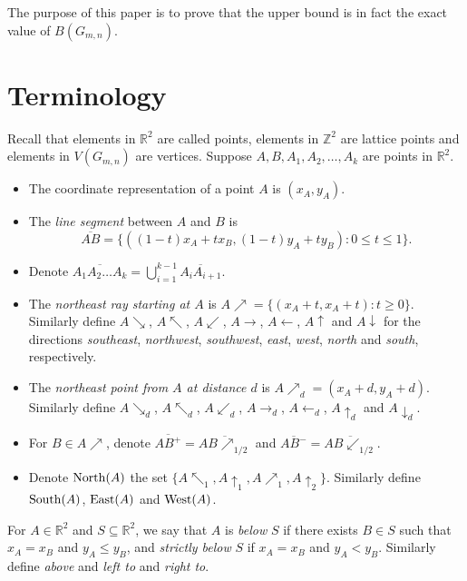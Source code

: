 \documentclass[preprint,12pt]{elsarticle}
\def\NEarrow#1{#1{\nearrow}}
\def\SEarrow#1{#1{\searrow}}
\def\NWarrow#1{#1{\nwarrow}}
\def\SWarrow#1{#1{\swarrow}}
\def\Westarrow#1{#1{\leftarrow}}
\def\Eastarrow#1{#1{\rightarrow}}
\def\Northarrow#1{#1{\uparrow}}
\def\Southarrow#1{#1{\downarrow}}
\def\NEArrow#1#2{#1{\nearrow}_{#2}}
\def\SEArrow#1#2{#1{\searrow}_{#2}}
\def\NWArrow#1#2{#1{\nwarrow}_{#2}}
\def\SWArrow#1#2{#1{\swarrow}_{#2}}
\def\WestArrow#1#2{#1{\leftarrow}_{#2}}
\def\EastArrow#1#2{#1{\rightarrow}_{#2}}
\def\NorthArrow#1#2{#1{\uparrow}_{#2}}
\def\SouthArrow#1#2{#1{\downarrow}_{#2}}
\def\North{{\rm North}}
\def\South{{\rm South}}
\def\East{{\rm East}}
\def\West{{\rm West}}
\begin{document}
{The purpose of this paper is to
prove that the upper bound is in fact the exact value of $B(G_{m,n})$.

\section{Terminology}\label{sec2}

Recall that elements in $\mathbb{R}^2$ are called points,
elements in $\mathbb{Z}^2$ are lattice points
and elements in $V(G_{m,n})$ are vertices.
Suppose $A,B,A_1,A_2,\ldots,A_k$ are points in $\mathbb{R}^2$.
\begin{itemize}
\item The coordinate representation of a point $A$ is $(x_A,y_A)$.

\item The {\em line segment} between $A$ and $B$ is
$$\overline{AB} = \{((1-t)x_A+tx_B,(1-t)y_A+ty_B): 0\le t\le 1\}.$$

\item Denote $\overline{A_1 A_2 \ldots A_k}=\bigcup_{i=1}^{k-1} \overline{A_i A_{i+1}}$.

\item The {\em northeast ray starting at $A$} is $\NEarrow{A}=\{(x_A+t,x_A+t): t\ge 0\}$.
Similarly define
$\SEarrow{A}$, $\NWarrow{A}$, $\SWarrow{A}$,
$\Eastarrow{A}$, $\Westarrow{A}$, $\Northarrow{A}$ and $\Southarrow{A}$
for the directions {\em southeast}, {\em northwest},
{\em southwest}, {\em east}, {\em west}, {\em north} and {\em south}, respectively.

\item The {\em northeast point from $A$ at distance $d$} is $\NEArrow{A}{d}=(x_A+d,y_A+d)$.
Similarly define
$\SEArrow{A}{d}$, $\NWArrow{A}{d}$, $\SWArrow{A}{d}$,
$\EastArrow{A}{d}$, $\WestArrow{A}{d}$, $\NorthArrow{A}{d}$ and $\SouthArrow{A}{d}$.

\item For $B\in\NEarrow{A}$, denote
$\overline{AB^+}=\overline{A\NEArrow{B}{1/2}}$ and
$\overline{AB^-}=\overline{A\SWArrow{B}{1/2}}$.

\item Denote $\North(A)$ the set
$\{\NWArrow{A}{1},\NorthArrow{A}{1},\NEArrow{A}{1},\NorthArrow{A}{2}\}$.
Similarly define $\South(A)$, $\East(A)$ and $\West(A)$.
\end{itemize}

For $A\in \mathbb{R}^2$ and $S\subseteq \mathbb{R}^{2}$,
we say that $A$ is {\em below} $S$
if there exists $B\in S$ such that $x_A= x_B$ and $y_A\le y_B$,
and {\em strictly below} $S$ if $x_A=x_B$ and $y_A<y_B$.
Similarly define {\em above} and {\em left to} and {\em right to}.

}
\end{document}
